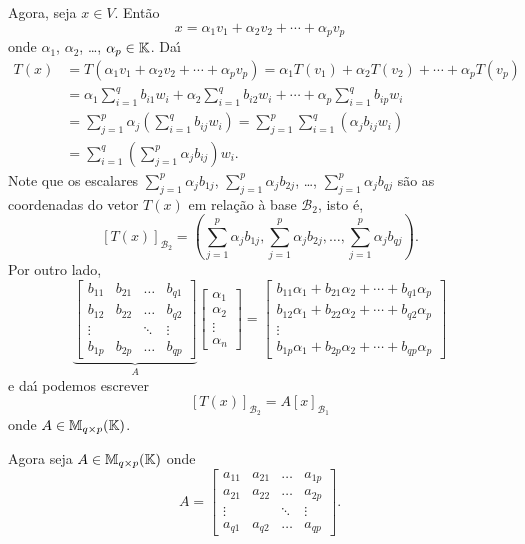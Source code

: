 Agora, seja $x \in V$. Ent\~ao
\[
	x = \alpha_1v_1 + \alpha_2v_2 + \cdots + \alpha_pv_p
\]
onde $\alpha_1$, $\alpha_2$, \dots, $\alpha_p \in \mathbb{K}$. Da{\'\i}
\begin{align*}
	T(x) &= T(\alpha_1v_1 + \alpha_2v_2 + \cdots + \alpha_pv_p) = \alpha_1T(v_1) + \alpha_2T(v_2) + \cdots + \alpha_pT(v_p)\\
	&= \alpha_1\sum_{i=1}^qb_{i1}w_i + \alpha_2\sum_{i=1}^qb_{i2}w_i + \cdots + \alpha_p\sum_{i=1}^qb_{ip}w_i\\
	&= \sum_{j=1}^p\alpha_j\left(\sum_{i=1}^qb_{ij}w_i\right) = \sum_{j=1}^p\sum_{i=1}^q(\alpha_jb_{ij}w_i)\\
	&= \sum_{i=1}^q\left(\sum_{j=1}^p\alpha_jb_{ij}\right)w_i.
\end{align*}
Note que os escalares $\sum_{j=1}^p\alpha_jb_{1j}$, $\sum_{j=1}^p\alpha_jb_{2j}$, \dots, $\sum_{j=1}^p\alpha_jb_{qj}$ s\~ao as coordenadas do vetor $T(x)$ em rela\c{c}\~ao \`a base $\mathcal{B}_2$, isto \'e,
\[
	[T(x)]_{\mathcal{B}_2} = \left(\sum_{j=1}^p\alpha_jb_{1j}, \sum_{j=1}^p\alpha_jb_{2j}, \dots, \sum_{j=1}^p\alpha_jb_{qj}\right).
\]
Por outro lado,
\[
	\underbrace{\begin{bmatrix}
		b_{11} & b_{21} & \dots & b_{q1}\\
		b_{12} & b_{22} & \dots & b_{q2}\\
		\vdots & & \ddots & \vdots\\
		b_{1p} & b_{2p} & \dots & b_{qp}
	\end{bmatrix}}_{A}\begin{bmatrix}
		\alpha_1\\
		\alpha_2\\
		\vdots\\
		\alpha_n
	\end{bmatrix} = \begin{bmatrix}
		b_{11}\alpha_1 + b_{21}\alpha_2 + \cdots + b_{q1}\alpha_p\\
		b_{12}\alpha_1 + b_{22}\alpha_2 + \cdots + b_{q2}\alpha_p\\
		\vdots \\
		b_{1p}\alpha_1 + b_{2p}\alpha_2 + \cdots + b_{qp}\alpha_p
	\end{bmatrix}
\]
e da{\'\i} podemos escrever
\[
	[T(x)]_{\mathcal{B}_2} = A[x]_{\mathcal{B}_1}
\]
onde $A \in \mathbb{M}_{q\times p}(\mathbb{K})$.

Agora seja $A \in \mathbb{M}_{q\times p}(\mathbb{K})$ onde
\[
	A = \begin{bmatrix}
		a_{11} & a_{21} & \dots & a_{1p}\\
		a_{21} & a_{22} & \dots & a_{2p}\\
		\vdots & & \ddots & \vdots\\
		a_{q1} & a_{q2} & \dots & a_{qp}
	\end{bmatrix}.
\]

